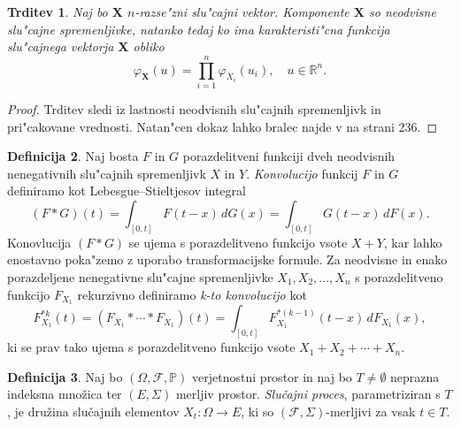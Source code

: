 \documentclass[12pt, a4paper, reqno]{amsart}
\theoremstyle{definition}
\newtheorem{definicija}{Definicija}[section]
\theoremstyle{plain}
\newtheorem{trditev}[definicija]{Trditev}
\newcommand{\R}{\mathbb{R}}
\newcommand{\1}{\mathds{1}}
\begin{document}
    \begin{trditev}
        Naj bo $\boldsymbol{X}$ $n$-razse"zni slu"cajni vektor. Komponente $\boldsymbol{X}$ so neodvisne
        slu"cajne spremenljivke, natanko tedaj ko ima karakteristi"cna funkcija slu"cajnega vektorja
        $\boldsymbol{X}$ obliko
        \begin{equation*}
            \varphi_{\boldsymbol{X}}(u) = \prod_{i=1}^n\varphi_{X_i}(u_i), \quad u\in\R^n.
        \end{equation*}
        \label{trd:karakteristicnaNeodivsnost}
    \end{trditev}

    \begin{proof}
        Trditev sledi iz lastnosti neodvisnih slu"cajnih spremenljivk in pri"cakovane vrednosti. Natan"cen 
        dokaz lahko bralec najde v \cite{7} na strani 236. 
    \end{proof}

    \begin{definicija}
        Naj bosta $F$ in $G$ porazdelitveni funkciji dveh neodvisnih nenegativnih slu"cajnih 
        spremenljivk $X$ in $Y$. \textit{Konvolucijo} funkcij $F$ in $G$ definiramo kot
        Lebesgue--Stieltjesov integral
        \begin{equation*}
            (F*G)(t) = \int_{[0, t]}F(t - x)\, dG(x) = \int_{[0, t]}G(t - x)\, dF(x).
        \end{equation*} 
        Konovlucija $(F*G)$ se ujema s porazdelitveno funkcijo vsote $X + Y$, kar lahko 
        enostavno poka"zemo z uporabo transformacijske formule.
        Za neodvisne in enako porazdeljene nenegativne slu"cajne spremenljivke $X_1, X_2, \dots, X_n$ 
        s porazdelitveno funkcijo $F_{X_1}$ rekurzivno definiramo \textit{k-to konvolucijo} kot
        \begin{equation*}
            F_{X_1}^{*k}(t) = (F_{X_1}*\cdots*F_{X_1})(t) = \int_{[0, t]}F_{X_1}^{*(k-1)}(t - x)\, dF_{X_1}(x),
        \end{equation*}
        ki se prav tako ujema s porazdelitveno funkcijo vsote $X_1 + X_2 + \cdots + X_n$. 
        \label{def:konvolucija}
    \end{definicija}

    \begin{definicija}
        Naj bo $(\Omega, \mathcal{F}, \mathbb{P})$ verjetnostni prostor in naj bo $T\neq\emptyset$
        neprazna indeksna množica ter $(E, \Sigma)$ merljiv prostor. \textit{Slučajni proces}, 
        parametriziran s $T$, je družina slučajnih elementov $X_t : \Omega \to E$,
         ki so $(\mathcal{F}, \Sigma)$-merljivi za vsak $t \in T$.
        \label{def:slucProc}
    \end{definicija}
\end{document}
